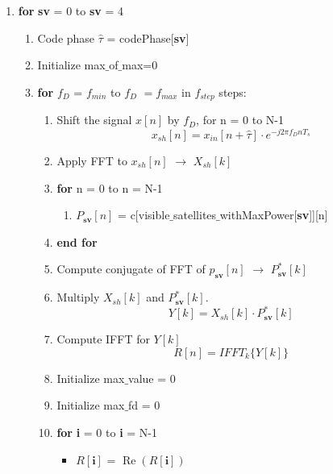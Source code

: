 \documentclass[journal,10pt,onecolumn]{article}
\begin{document}
\begin{enumerate}
    \item  \textbf{for} \textbf{sv} = 0  to \textbf{sv} = 4
    \begin{enumerate}
        \item[] Code phase $\hat{\tau}$ = codePhase[\textbf{sv}]
            \item[] Initialize max$\_$of$\_$max=0
            \item[] \textbf{for} \textbf{$f_D$} = $f_{min}$ to \textbf{$f_D$} $= f_{max}$ in $f_{step}$ steps:
            \begin{enumerate}
                \item[] Shift the signal $x[n]$ by $f_D$, for n = 0 to N-1
                \begin{equation}
                    x_{sh}[n] = x_{in}[n+\hat{\tau}]\cdot e ^{-j 2 \pi f_D n T_s} 
                \end{equation}
                \item[] Apply FFT to $x_{sh}[n]$ $\longrightarrow$ $X_{sh}[k]$
                \item[] \textbf{for} n = 0 to n = N-1
                \begin{enumerate}
                    \item[] $P_{\textbf{sv}}[n]$ = c[visible$\_$satellites$\_$withMaxPower[\textbf{sv}]][n] 
                \end{enumerate}
                \item[] \textbf{end for}
                
                \item[] Compute conjugate of FFT of $p_{\textbf{sv}}[n]$ $\longrightarrow $  $P_{\textbf{sv}}^*[k ]$
            \item[] Multiply $X_{sh}[k]$ and $P_{\textbf{sv}}^*[k ]$.
                \begin{equation}
                    Y[k] = X_{sh}[k] \cdot P_{\textbf{sv}}^*[k]                
                \end{equation}
            \item[] Compute IFFT for $Y[k]$
                \begin{equation}
                    R[n] =  IFFT_k \{Y[k] \} 
                \end{equation}
            \item[] Initialize max$\_$value = 0
            \item[] Initialize max$\_$fd    = 0
            \item[] \textbf{for} \textbf{i} = 0 to \textbf{i} = N-1
            \begin{itemize}
                \item[] $R[\textbf{i}]$ = $\operatorname{Re}(R[\textbf{i}])$
            \end{itemize}
            

\end{enumerate}
\end{enumerate}
\end{enumerate}
\end{document}
